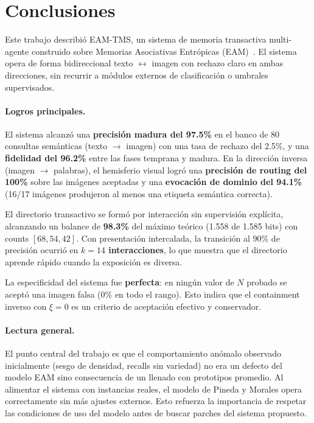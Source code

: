 \section{Conclusiones}
\label{sec:conclusiones}

Este trabajo describió EAM-TMS, un sistema de memoria transactiva multi-agente construido sobre Memorias Asociativas Entrópicas (EAM)~\cite{pineda2021entropic,pineda2024hetero}.
El sistema opera de forma bidireccional texto $\leftrightarrow$ imagen con rechazo claro en ambas direcciones, sin recurrir a módulos externos de clasificación o umbrales supervisados.

\paragraph{Logros principales.}
El sistema alcanzó una \textbf{precisión madura del 97.5\%} en el banco de 80 consultas semánticas (texto $\to$ imagen) con una tasa de rechazo del 2.5\%, y una \textbf{fidelidad del 96.2\%} entre las fases temprana y madura.
En la dirección inversa (imagen $\to$ palabras), el hemisferio visual logró una \textbf{precisión de routing del 100\%} sobre las imágenes aceptadas y una \textbf{evocación de dominio del 94.1\%} (16/17 imágenes produjeron al menos una etiqueta semántica correcta).

El directorio transactivo se formó por interacción sin supervisión explícita, alcanzando un balance de \textbf{98.3\%} del máximo teórico (1.558 de 1.585 bits) con counts $[68, 54, 42]$.
Con presentación intercalada, la transición al 90\% de precisión ocurrió en \textbf{$k = 14$ interacciones}, lo que muestra que el directorio aprende rápido cuando la exposición es diversa.

La especificidad del sistema fue \textbf{perfecta}: en ningún valor de $N$ probado se aceptó una imagen falsa (0\% en todo el rango). Esto indica que el containment inverso con $\xi = 0$ es un criterio de aceptación efectivo y conservador.

\paragraph{Lectura general.}
El punto central del trabajo es que el comportamiento anómalo observado inicialmente (sesgo de densidad, recalls sin variedad) no era un defecto del modelo EAM sino consecuencia de un llenado con prototipos promedio.
Al alimentar el sistema con instancias reales, el modelo de Pineda y Morales opera correctamente sin más ajustes externos.
Esto refuerza la importancia de respetar las condiciones de uso del modelo antes de buscar parches del sistema propuesto.

